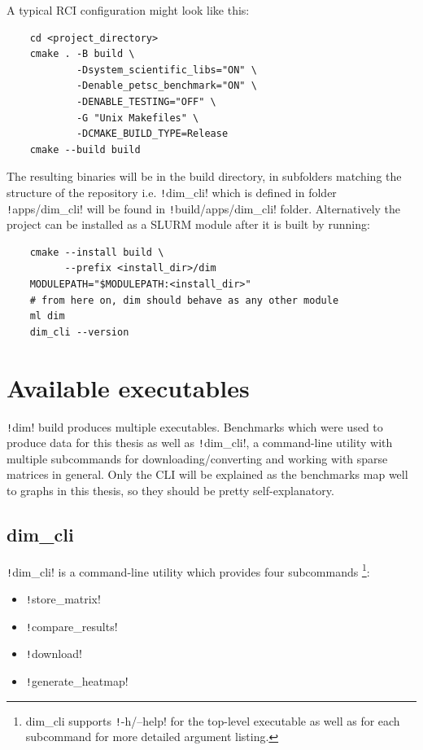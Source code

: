 \documentclass[thesis=M,english]{FITthesis}[2019/12/23]
\newcommand{\csre}[1]{\texttt!#1!}
\begin{document}
A typical RCI configuration might look like this:
\begin{verbatim}
    cd <project_directory>
    cmake . -B build \
            -Dsystem_scientific_libs="ON" \
            -Denable_petsc_benchmark="ON" \
            -DENABLE_TESTING="OFF" \
            -G "Unix Makefiles" \
            -DCMAKE_BUILD_TYPE=Release
    cmake --build build
\end{verbatim}

The resulting binaries will be in the build directory, in subfolders matching the structure of
the repository i.e. \csre{dim_cli} which is defined in folder \csre{apps/dim_cli} will be found
in \csre{build/apps/dim_cli} folder. Alternatively the project can be installed as a SLURM module
after it is built by running:

\begin{verbatim}
    cmake --install build \
          --prefix <install_dir>/dim
    MODULEPATH="$MODULEPATH:<install_dir>"
    # from here on, dim should behave as any other module
    ml dim
    dim_cli --version
\end{verbatim}

\section{Available executables}

\csre{dim} build produces multiple executables. Benchmarks which were used to produce data for this thesis as
well as \csre{dim_cli}, a command-line utility with multiple subcommands for downloading/converting and
working with sparse matrices in general. Only the CLI will be explained as the benchmarks map well to
graphs in this thesis, so they should be pretty self-explanatory.

\subsection{dim\_cli}

\csre{dim_cli} is a command-line utility which provides four subcommands
\footnote{dim\_cli supports \csre{-h/--help} for the top-level executable as well as for each subcommand for more detailed argument listing.}:
\begin{itemize}
    \item \csre{store_matrix}
    \item \csre{compare_results}
    \item \csre{download}
    \item \csre{generate_heatmap}
\end{itemize}
\end{document}
